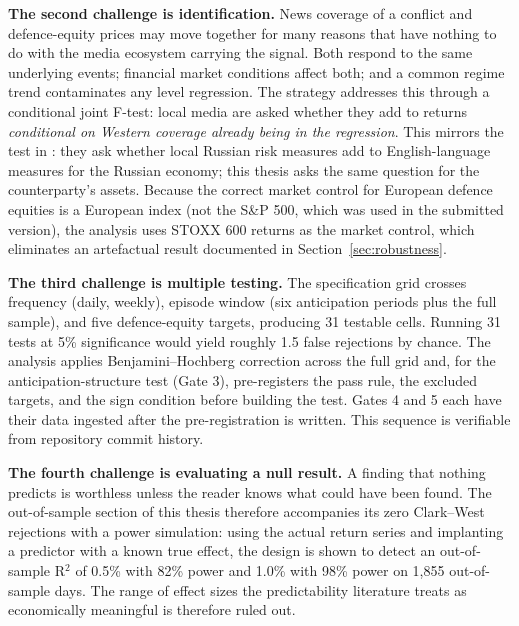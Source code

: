 \documentclass[12pt,a4paper]{article}
\begin{document}
\textbf{The second challenge is identification.} News coverage of a conflict and defence-equity prices may move together for many reasons that have nothing to do with the media ecosystem carrying the signal. Both respond to the same underlying events; financial market conditions affect both; and a common regime trend contaminates any level regression. The strategy addresses this through a conditional joint F-test: local media are asked whether they add to returns \textit{conditional on Western coverage already being in the regression}. This mirrors the test in \citet{bondarenko2024}: they ask whether local Russian risk measures add to English-language measures for the Russian economy; this thesis asks the same question for the counterparty's assets. Because the correct market control for European defence equities is a European index (not the S\&P 500, which was used in the submitted version), the analysis uses STOXX 600 returns as the market control, which eliminates an artefactual result documented in Section~\ref{sec:robustness}.

\textbf{The third challenge is multiple testing.} The specification grid crosses frequency (daily, weekly), episode window (six anticipation periods plus the full sample), and five defence-equity targets, producing 31 testable cells. Running 31 tests at 5\% significance would yield roughly 1.5 false rejections by chance. The analysis applies Benjamini--Hochberg correction across the full grid and, for the anticipation-structure test (Gate 3), pre-registers the pass rule, the excluded targets, and the sign condition before building the test. Gates 4 and 5 each have their data ingested after the pre-registration is written. This sequence is verifiable from repository commit history.

\textbf{The fourth challenge is evaluating a null result.} A finding that nothing predicts is worthless unless the reader knows what could have been found. The out-of-sample section of this thesis therefore accompanies its zero Clark--West rejections with a power simulation: using the actual return series and implanting a predictor with a known true effect, the design is shown to detect an out-of-sample R$^2$ of 0.5\% with 82\% power and 1.0\% with 98\% power on 1,855 out-of-sample days. The range of effect sizes the predictability literature treats as economically meaningful is therefore ruled out.
\end{document}
